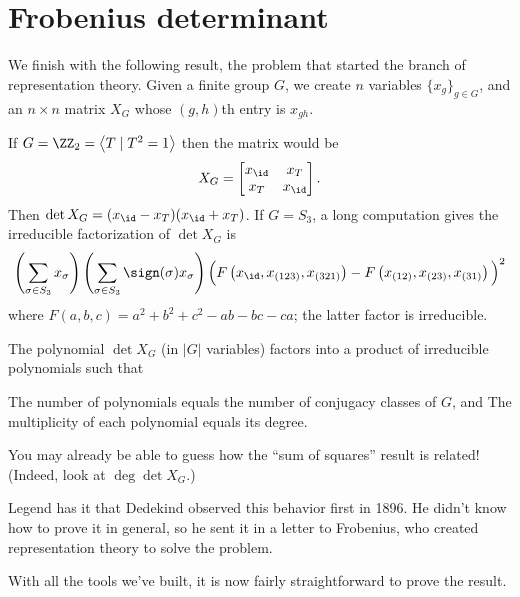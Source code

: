 \section{Frobenius determinant}
We finish with the following result,
the problem that started the branch of representation theory.
Given a finite group $G$,
we create $n$ variables $\{x_g\}_{g \in G}$,
and an $n \times n$ matrix $X_G$ whose $(g,h)$th entry is $x_{gh}$.
\begin{example}
	\listhack
	\begin{enumerate}[(a)]
	\ii If $G = \Zc 2 = \left< T \mid T^2 = 1\right>$
	then the matrix would be \[ X_G =
	\begin{bmatrix} x_{\id} & x_T \\ x_T & x_{\id} \end{bmatrix}. \]
	Then $\det X_G = (x_{\id}-x_T)(x_{\id}+x_T)$.
	\ii If $G = S_3$, a long computation gives
	the irreducible factorization of $\det X_G$ is
	\[
		\left( \sum_{\sigma \in S_3} x_{\sigma} \right)
		\left( \sum_{\sigma \in S_3} \sign(\sigma)x_\sigma \right)
		\Big( F\left(x_\id, x_{(123)}, x_{(321)}\right)
		- F\left(x_{(12)}, x_{(23)}, x_{(31)}\right) \Big)^2 \]
	where $F(a,b,c) = a^2+b^2+c^2-ab-bc-ca$;
	the latter factor is irreducible.
	\end{enumerate}
\end{example}
\begin{theorem}
	The polynomial $\det X_G$ (in $|G|$ variables) factors
	into a product of irreducible polynomials such that
	\begin{enumerate}[(i)]
		\ii The number of polynomials equals the number
		of conjugacy classes of $G$, and
		\ii The multiplicity of each polynomial
		equals its degree.
	\end{enumerate}
\end{theorem}
You may already be able to guess how the ``sum of squares'' result
is related! (Indeed, look at $\deg\det X_G$.)

Legend has it that Dedekind observed this behavior first in 1896.
He didn't know how to prove it in general,
so he sent it in a letter to Frobenius,
who created representation theory to solve the problem.

With all the tools we've built, it is now fairly straightforward
to prove the result.

